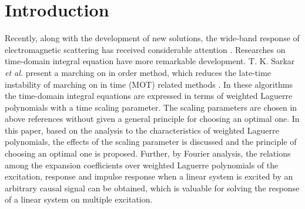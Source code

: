 \documentclass[conference, a4paper]{IEEEtran}
\begin{document}
%
\IEEEpeerreviewmaketitle



\section{Introduction}
Recently, along with the development of new solutions, the wide-band response of
electromagnetic scattering has received considerable attention
\cite{kashyap:stabilizing:1998,hujinlin:temporal:2001,jung:cfie:2002,jizhong:solving:2006}.
Researches
on time-domain integral equation have more remarkable development. T. K.
Sarkar {\em et al.} present a marching on in order method, which
reduces the late-time instability of marching on in time (MOT) related
methods \cite{jizhong:solving:2006,jung:accurate:2002,jung:analysis:2004,jung:time:2003}. In these algorithms the time-domain integral equations
are expressed in terms of weighted Laguerre polynomials with a time
scaling parameter. The scaling parameters are chosen in above references
without given a general principle for choosing an optimal one. In this
paper, based on the analysis to the characteristics of weighted Laguerre
polynomials, the effects of the scaling parameter is discussed and the
principle of choosing an optimal one is proposed. Further, by Fourier
analysis, the relations among the expansion coefficients over weighted Laguerre
polynomials of the excitation, response and impulse response when a
linear system is excited by an arbitrary causal signal can be obtained,
which is valuable for solving the response of a linear system on
multiple excitation.


%
\end{document}
